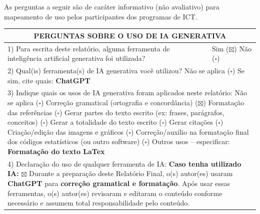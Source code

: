 \documentclass{article}
\begin{document}
As perguntas a seguir são de caráter informativo (não avaliativo) para mapeamento de uso pelos participantes dos programas de ICT.

\renewcommand{\arraystretch}{1.4}
\begin{table}[H]
\centering
\small
\begin{tabularx}{\textwidth}{|X|l|}
\hline
\multicolumn{2}{|c|}{\textbf{PERGUNTAS SOBRE O USO DE IA GENERATIVA}} \\
\hline

1) Para escrita deste relatório, alguma ferramenta de inteligência artificial generativa foi utilizada? & Sim ($\boxtimes$) \hspace{0.5cm} Não ($\square$) \\
\hline
\multicolumn{2}{|p{\dimexpr\textwidth-2\tabcolsep-2\arrayrulewidth}|}{2) Qual(is) ferramenta(s) de IA generativa você utilizou? \newline Não se aplica ($\square$) \hspace{0.5cm} Se sim, cite quais: \textbf{ChatGPT}} \\
\hline
\multicolumn{2}{|p{\dimexpr\textwidth-2\tabcolsep-2\arrayrulewidth}|}{3) Indique quais os usos de IA generativa foram aplicados neste relatório: \newline Não se aplica ($\square$) \newline Correção gramatical (ortografia e concordância) ($\boxtimes$) \newline Formatação das referências ($\square$) \newline Gerar partes do texto escrito (ex: frases, parágrafos, conceitos) ($\square$) \newline Gerar a totalidade do texto escrito ($\square$) \newline Gerar citações ($\square$) \newline Criação/edição das imagens e gráficos ($\square$) \newline Correção/auxílio na formatação final dos códigos estatísticos (ou outro software) ($\square$) \newline Outros usos -- especificar: \textbf{Formatação do texto LaTex}} \\
\hline
\multicolumn{2}{|p{\dimexpr\textwidth-2\tabcolsep-2\arrayrulewidth}|}{4) Declaração do uso de qualquer ferramenta de IA: \newline \textbf{Caso tenha utilizado IA:} \newline $\boxtimes$ Durante a preparação deste Relatório Final, o(s) autor(es) usaram \textbf{ChatGPT} para \textbf{correção gramatical e formatação}. Após usar essas ferramentas, o(s) autor(es) revisaram e editaram o conteúdo conforme necessário e assumem total responsabilidade pelo conteúdo.} \\
\hline
\end{tabularx}
\end{table}
\end{document}
